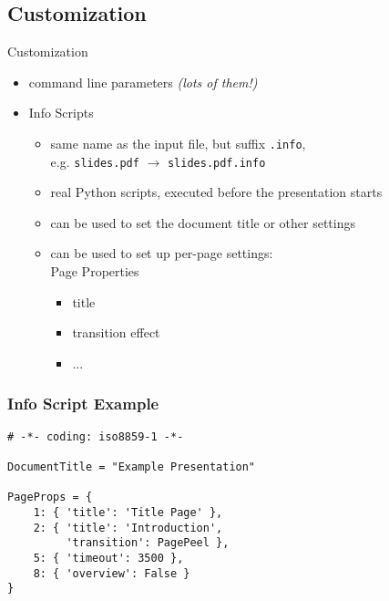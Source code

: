 \documentclass[bigger,hyperref={colorlinks=true,linkcolor=white,urlcolor=blue}]{beamer}
\begin{document}
\subsection{Customization}
\begin{frame}{Customization}
    \begin{itemize}
        \item command line parameters \emph{(lots of them!)}
        \item {\glqq}Info Scripts{\grqq}
        \begin{itemize}
            \item same name as the input file, but suffix \texttt{.info}, \\
                  e.g. \texttt{slides.pdf} $\rightarrow$ \texttt{slides.pdf.info}
            \item real Python scripts, executed before the presentation starts
            \item can be used to set the document title or other settings
            \item can be used to set up per-page settings: \\
                  {\glqq}Page Properties{\grqq}
                \begin{itemize}
                    \item title
                    \item transition effect
                    \item ...
                \end{itemize}
        \end{itemize}
    \end{itemize}
\end{frame}
\begin{frame}[fragile]
\frametitle{Info Script Example}
\begin{verbatim}
# -*- coding: iso8859-1 -*-

DocumentTitle = "Example Presentation"

PageProps = {
    1: { 'title': 'Title Page' },
    2: { 'title': 'Introduction',
         'transition': PagePeel },
    5: { 'timeout': 3500 },
    8: { 'overview': False }
}
\end{verbatim}
\end{frame}
\end{document}
